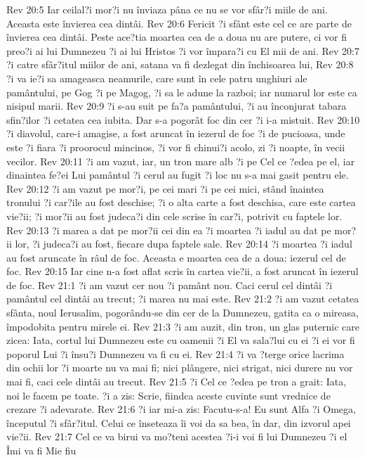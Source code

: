 Rev 20:5  Iar ceilal?i mor?i nu înviaza pâna ce nu se vor sfâr?i miile de ani. Aceasta este învierea cea dintâi.
Rev 20:6  Fericit ?i sfânt este cel ce are parte de învierea cea dintâi. Peste ace?tia moartea cea de a doua nu are putere, ci vor fi preo?i ai lui Dumnezeu ?i ai lui Hristos ?i vor împara?i cu El mii de ani.
Rev 20:7  ?i catre sfâr?itul miilor de ani, satana va fi dezlegat din închisoarea lui,
Rev 20:8  ?i va ie?i sa amageasca neamurile, care sunt în cele patru unghiuri ale pamântului, pe Gog ?i pe Magog, ?i sa le adune la razboi; iar numarul lor este ca nisipul marii.
Rev 20:9  ?i s-au suit pe fa?a pamântului, ?i au înconjurat tabara sfin?ilor ?i cetatea cea iubita. Dar s-a pogorât foc din cer ?i i-a mistuit.
Rev 20:10  ?i diavolul, care-i amagise, a fost aruncat în iezerul de foc ?i de pucioasa, unde este ?i fiara ?i proorocul mincinos, ?i vor fi chinui?i acolo, zi ?i noapte, în vecii vecilor.
Rev 20:11  ?i am vazut, iar, un tron mare alb ?i pe Cel ce ?edea pe el, iar dinaintea fe?ei Lui pamântul ?i cerul au fugit ?i loc nu s-a mai gasit pentru ele.
Rev 20:12  ?i am vazut pe mor?i, pe cei mari ?i pe cei mici, stând înaintea tronului ?i car?ile au fost deschise; ?i o alta carte a fost deschisa, care este cartea vie?ii; ?i mor?ii au fost judeca?i din cele scrise în car?i, potrivit cu faptele lor.
Rev 20:13  ?i marea a dat pe mor?ii cei din ea ?i moartea ?i iadul au dat pe mor?ii lor, ?i judeca?i au fost, fiecare dupa faptele sale.
Rev 20:14  ?i moartea ?i iadul au fost aruncate în râul de foc. Aceasta e moartea cea de a doua: iezerul cel de foc.
Rev 20:15  Iar cine n-a fost aflat scris în cartea vie?ii, a fost aruncat în iezerul de foc.
Rev 21:1  ?i am vazut cer nou ?i pamânt nou. Caci cerul cel dintâi ?i pamântul cel dintâi au trecut; ?i marea nu mai este.
Rev 21:2  ?i am vazut cetatea sfânta, noul Ierusalim, pogorându-se din cer de la Dumnezeu, gatita ca o mireasa, împodobita pentru mirele ei.
Rev 21:3  ?i am auzit, din tron, un glas puternic care zicea: Iata, cortul lui Dumnezeu este cu oamenii ?i El va sala?lui cu ei ?i ei vor fi poporul Lui ?i însu?i Dumnezeu va fi cu ei.
Rev 21:4  ?i va ?terge orice lacrima din ochii lor ?i moarte nu va mai fi; nici plângere, nici strigat, nici durere nu vor mai fi, caci cele dintâi au trecut.
Rev 21:5  ?i Cel ce ?edea pe tron a grait: Iata, noi le facem pe toate. ?i a zis: Scrie, fiindca aceste cuvinte sunt vrednice de crezare ?i adevarate.
Rev 21:6  ?i iar mi-a zis: Facutu-s-a! Eu sunt Alfa ?i Omega, începutul ?i sfâr?itul. Celui ce înseteaza îi voi da sa bea, în dar, din izvorul apei vie?ii.
Rev 21:7  Cel ce va birui va mo?teni acestea ?i-i voi fi lui Dumnezeu ?i el Îmi va fi Mie fiu
